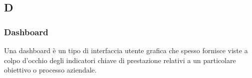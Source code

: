 \subsection*{\textbf{\hfill \Huge{D} \hfill}} 
\subsubsection*{Dashboard}
Una dashboard è un tipo di interfaccia utente grafica che spesso fornisce viste a colpo d'occhio degli indicatori chiave di prestazione relativi a un particolare obiettivo o processo aziendale.